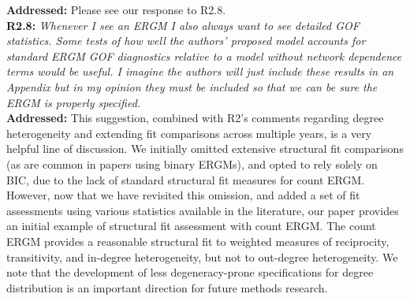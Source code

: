 \documentclass[a4paper,11pt]{texMemo}
\begin{document}
\noindent \textbf{Addressed:} Please see our response to R2.8.  \\

\noindent \textbf{R2.8:} \emph{Whenever I see an ERGM I also always want to see detailed GOF statistics. Some tests of how well the authors' proposed model accounts for standard ERGM GOF diagnostics relative to a model without network dependence terms would be useful. I imagine the authors will just include these results in an Appendix but in my opinion they must be included so that we can be sure the ERGM is properly specified.}\\

\noindent \textbf{Addressed:}  This suggestion, combined with R2's comments regarding degree heterogeneity and extending fit comparisons across multiple years, is a very helpful line of discussion. We initially omitted extensive structural fit comparisons (as are common in papers using binary ERGMs), and opted to rely solely on BIC, due to the lack of standard structural fit measures for count ERGM. However, now that we have revisited this omission, and added a set of fit assessments using various statistics available in the literature, our paper provides an initial example of structural fit assessment with count ERGM.  The count ERGM provides a reasonable structural fit to weighted measures of reciprocity, transitivity, and in-degree heterogeneity, but not to out-degree heterogeneity. We note that the development of less degeneracy-prone specifications for degree distribution is an important direction for future methods research. \\
\\
\end{document}
